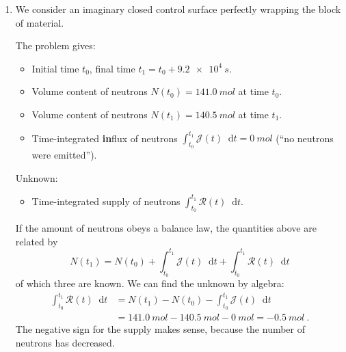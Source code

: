 \documentclass[a4paper,12pt,%
onecolumn,oneside,%
british%
]{memoir}
\newcommand*{\di}{\mathop{}\!\mathrm{d}}%
\renewcommand*{\|}[1][]{\nonscript\:#1\vert\nonscript\:\mathopen{}}
\newcommand*{\yti}{t_{0}}
\newcommand*{\ytf}{t_{1}}
\newcommand*{\dt}{\di t}
\newcommand*{\yN}{N}
\newcommand*{\yJ}{\mathcal{J}}
\newcommand*{\yR}{\mathcal{R}}
\newcommand*{\yE}{E}
\newcommand*{\yH}{W}
\begin{document}
\begin{enumerate}[exerc]
  If energy obeys a conservation law, the quantities above are related by
  \begin{equation*}
    \yE(\ytf) = \yE(\yti) + \int_{\yti}^{\ytf}\!\!\yH(t)\dt
  \end{equation*}
of which two are known. We can find the unknown by simple algebra:
\begin{equation*}
  \begin{split}
    \yE(\yti) &= \yE(\ytf) - \int_{\yti}^{\ytf}\!\!\yH(t)\dt
    \\&= \qty{0}{J} + \qty{4300}{J} 
    = \qty{4300}{J} \ .
  \end{split}
\end{equation*}

\item We consider an imaginary closed control surface perfectly wrapping the block of material.

  The problem gives:
  \begin{itemize}[nosep]
  \item Initial time $\yti$, final time $\ytf=\yti + \qty{9.2e4}{s}$.
  \item Volume content of neutrons $\yN(\yti)=\qty{141.0}{mol}$ at time $\yti$.
  \item Volume content of neutrons $\yN(\ytf)=\qty{140.5}{mol}$ at time $\ytf$.
  \item Time-integrated \textbf{in}flux of neutrons $\int_{\yti}^{\ytf}\!\yJ(t)\dt = \qty{0}{mol}$ (\enquote{no neutrons were emitted}).
  \end{itemize}
  Unknown:
  \begin{itemize}[nosep]
  \item Time-integrated supply of neutrons $\int_{\yti}^{\ytf}\!\yR(t)\dt$.
  \end{itemize}

  If the amount of neutrons obeys a balance law, the quantities above are related by
  \begin{equation*}
    \yN(\ytf) = \yN(\yti) + \int_{\yti}^{\ytf}\!\!\yJ(t)\dt
    + \int_{\yti}^{\ytf}\!\!\yR(t)\dt
  \end{equation*}
of which three are known. We can find the unknown by algebra:
\begin{equation*}
  \begin{split}
    \int_{\yti}^{\ytf}\!\!\yR(t)\dt &=    \yN(\ytf) - \yN(\yti)
    - \int_{\yti}^{\ytf}\!\!\yJ(t)\dt
    \\&= \qty{141.0}{mol} - \qty{140.5}{mol} - \qty{0}{mol}
    = -\qty{0.5}{mol} \ .
  \end{split}
\end{equation*}
The negative sign for the supply makes sense, because the number of neutrons has decreased.


\end{enumerate}
\end{document}
